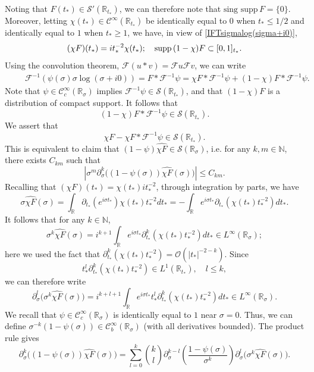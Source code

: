 \documentclass[10pt,a4paper,reqno]{amsart}
\newcommand{\CI}{\mathcal{C}^\infty}
\newcommand{\CcI}{\mathcal{C}_c^\infty}
\newcommand{\RR}{\mathbb{R}}
\newcommand{\NN}{\mathbb{N}}
\newcommand{\supp}{\text{supp\,}}
\theoremstyle{definition}
\theoremstyle{remark}
\numberwithin{equation}{section}
\newcommand{\ts}{t_*}
\begin{document}
Noting that $F(\ts) \in \mathscr{S}'(\RR_{\ts})$, we can therefore note that $\text{sing supp}\,F = \{0\}$. Moreover, letting $\chi(\ts)\in \CI(\RR_{\ts})$ be identically equal to $0$ when $\ts\leq 1/2$ and identically equal to
$1$ when $\ts\geq 1$, we have, in view of \eqref{IFTsigmalog(sigma+i0)},
\[
    (\chi F)(\ts) = i\ts^{-2} \chi(\ts);\quad \supp (1-\chi)F \subset [0,1]_{\ts}.
\]
Using the convolution theorem, $\mathcal{F}(u\ast v) = \mathcal{F}u \mathcal{F}v$, we can write
\[
\begin{split}
    { }&\quad\ \mathcal{F}^{-1} (\psi(\sigma)\sigma\log(\sigma+i0)) = F \ast \mathcal{F}^{-1}\psi = \chi F \ast \mathcal{F}^{-1}\psi + (1-\chi)F \ast \mathcal{F}^{-1}\psi.
\end{split}
\]
Note that $\psi\in\CcI(\RR_\sigma)$ implies $\mathcal{F}^{-1}\psi\in\mathscr{S}(\RR_{\ts})$, and that $(1-\chi)F$ is a distribution of compact support. It follows that
\[
    (1-\chi)F \ast \mathcal{F}^{-1}\psi \in \mathscr{S}(\RR_{\ts}).
\]
We assert that 
\[
    \chi F - \chi F \ast \mathcal{F}^{-1}\psi \in \mathscr{S}(\RR_{\ts}).
\]
This is equivalent to claim that $(1-\psi)\widehat{\chi F} \in\mathscr{S}(\RR_\sigma)$, i.e. for any $k, m\in\NN$, there exists $C_{km}$ such that
\begin{equation}
\label{bound by Ckm}
	\left|\sigma^m \partial_\sigma^k \big((1-\psi(\sigma))\widehat{\chi F}(\sigma)\big)\right| \leq C_{km} .
\end{equation}
Recalling that $(\chi F)(t_* ) = \chi(t_*) it_*^{-2}$, through integration by parts, we have
\[
	\sigma \widehat{\chi F}(\sigma) = \int_{\RR} \partial_{t_*} (e^{i\sigma t_*}) \chi(t_*) t_*^{-2} d t_* = - \int_{\RR} e^{i\sigma t_*} \partial_{t_*} (\chi(t_*) t_*^{-2}) d t_* .
\]
It follows that for any $k\in\NN$,
\[
	\sigma^k \widehat{\chi F}(\sigma) = i^{k+1} \int_{\RR} e^{i\sigma t_*} \partial_{t_*}^k (\chi(t_*) t_*^{-2}) d t_* \in L^\infty(\RR_\sigma);
\]
here we used the fact that $\partial_{t_*}^k (\chi(t_*) t_*^{-2}) = \mathcal{O}(|t_*|^{-2-k})$. Since 
$$t_*^l \partial_{t_*}^k (\chi(t_*) t_*^{-2}) \in L^1(\RR_{t_*}), \quad l\leq k,$$ 
we can therefore write
\[
	\partial_\sigma^l \big(\sigma^k \widehat{\chi F}(\sigma)\big) = i^{k+l+1} \int_{\RR} e^{i\sigma t_*} t_*^l \partial_{t_*}^k (\chi(t_*) t_*^{-2}) d t_* \in L^\infty(\RR_\sigma).
\]
We recall that $\psi\in\CcI(\RR_\sigma)$ is identically equal to $1$ near $\sigma=0$. Thus, we can define $\sigma^{-k} (1-\psi(\sigma)) \in \CI_b(\RR_\sigma)$ (with all derivatives bounded). The product rule gives
\begin{equation}
\label{eqn:Leibniz schwartz}
	\partial_\sigma^k \big((1-\psi(\sigma))\widehat{\chi F}(\sigma)\big) = \sum_{l=0}^k \binom{k}{l} \partial_\sigma^{k-l}\left(\frac{1-\psi(\sigma)}{\sigma^k}\right) \partial_\sigma^{l} \big(\sigma^k \widehat{\chi F}(\sigma)\big).
\end{equation}
\end{document}
